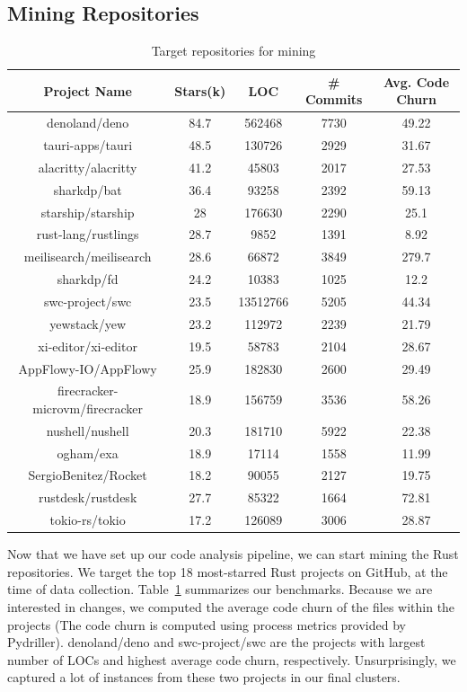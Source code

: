 \subsection{\label{sec:mining_repositories}Mining Repositories}

\begin{table}
\caption{\label{table:repos} Target repositories for mining}
\begin{tabular}{c|c|c|c|c}
    Project Name & Stars(k) & LOC & \# Commits & Avg. Code Churn \\ \hline
    denoland/deno & 84.7 & 562468 & 7730 & 49.22 \\ \hline
    tauri-apps/tauri & 48.5 & 130726 & 2929 & 31.67 \\ \hline
    alacritty/alacritty & 41.2 & 45803 & 2017 & 27.53 \\ \hline
    sharkdp/bat & 36.4 & 93258 & 2392 & 59.13 \\ \hline
    starship/starship & 28 & 176630 & 2290 & 25.1 \\ \hline
    rust-lang/rustlings & 28.7 & 9852 & 1391 & 8.92 \\ \hline
    meilisearch/meilisearch & 28.6 & 66872 & 3849 & 279.7 \\ \hline
    sharkdp/fd & 24.2 & 10383 & 1025 & 12.2 \\ \hline
    swc-project/swc & 23.5 & 13512766 & 5205 & 44.34 \\ \hline
    yewstack/yew & 23.2 & 112972 & 2239 & 21.79 \\ \hline
    xi-editor/xi-editor & 19.5 & 58783 & 2104 & 28.67 \\ \hline
    AppFlowy-IO/AppFlowy & 25.9 & 182830 & 2600 & 29.49 \\ \hline
    firecracker-microvm/firecracker & 18.9 & 156759 & 3536 & 58.26 \\ \hline
    nushell/nushell & 20.3 & 181710 & 5922 & 22.38 \\ \hline
    ogham/exa & 18.9 & 17114 & 1558 & 11.99 \\ \hline
    SergioBenitez/Rocket & 18.2 & 90055 & 2127 & 19.75 \\ \hline
    rustdesk/rustdesk & 27.7 & 85322 & 1664 & 72.81 \\ \hline
    tokio-rs/tokio & 17.2 & 126089 & 3006 & 28.87 
\end{tabular}
\end{table}
   

Now that we have set up our code analysis pipeline, we can start mining the Rust repositories. We target the top 18 most-starred Rust projects on GitHub, at the time of data collection. Table~\ref{table:repos} summarizes our benchmarks. Because we are interested in changes, we computed the average code churn of the files within the projects (The code churn is computed using process metrics provided by Pydriller). denoland/deno and swc-project/swc are the projects with largest number of LOCs and highest average code churn, respectively. Unsurprisingly, we captured a lot of instances from these two projects in our final clusters.

